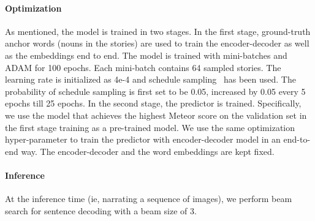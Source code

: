 \vspace{-10pt}

\paragraph{Optimization} As mentioned, the model is trained in two stages. In the first stage, ground-truth anchor words (nouns in the stories) are used to train the encoder-decoder as well as the embeddings end to end. The model is trained with mini-batches and ADAM for 100 epochs. Each mini-batch contains 64 sampled stories. The learning rate is initialized as 4e-4 and schedule sampling~\cite{bengio2015scheduled} has been used. The probability of schedule sampling is first set to be 0.05, increased by 0.05 every 5 epochs till 25 epochs. In the second stage, the predictor  is trained. Specifically, we use the model that achieves the highest Meteor score on the validation set in the first stage training as a pre-trained model. We use the same optimization hyper-parameter to train the predictor with encoder-decoder model in an end-to-end way. The encoder-decoder and the word embeddings are kept fixed.


\paragraph{Inference} At the inference time (ie, narrating a sequence of images), we perform beam search for sentence decoding with a beam size of 3.
